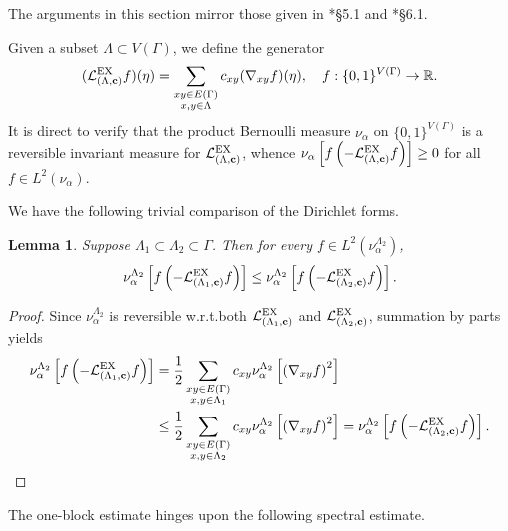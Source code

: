 \documentclass[11pt]{amsart}
\theoremstyle{plain}
\newtheorem{lemma}{Lemma}[section]
\theoremstyle{definition}
\theoremstyle{remark}
\begin{document}
The arguments in this section mirror those given in \cite{Jara}*{\S 5.1} and \cite{JLSLocal}*{\S 6.1}.

Given a subset $\Lambda \subset V(\Gamma)$, we define the generator
\begin{align}
(\mathcal{L}^{\rm EX}_{(\Lambda,{\bf c})} f)(\eta) = \sum_{\substack{xy\in E(\Gamma) \\ x,y \in \Lambda}} c_{xy} (\nabla_{xy} f)(\eta), \quad f: \{0,1\}^{V(\Gamma)} \to\mathbb{R}. 
\end{align}
It is direct to verify that the product Bernoulli measure $\nu_\alpha$ on $\{0,1\}^{V(\Gamma)}$ is a reversible invariant measure for $\mathcal{L}^{\rm EX}_{(\Lambda,{\bf c})}$, whence $\nu_\alpha\left[f \left( -\mathcal{L}^{\rm EX}_{(\Lambda,{\bf c})} f\right)\right] \geq 0$ for all $f\in L^2(\nu_\alpha)$. 

We have the following trivial comparison of the Dirichlet forms.
\begin{lemma}
\label{lem:DFEst1}
Suppose $\Lambda_1 \subset \Lambda_2 \subset \Gamma$. Then for every $f \in L^2(\nu_\alpha^{\Lambda_2})$, 
\begin{align}
\nu_\alpha^{\Lambda_2}\left[ f\left(-\mathcal{L}^{\rm EX}_{(\Lambda_1,{\bf c})}f\right)\right] \leq \nu_\alpha^{\Lambda_2} \left[ f \left( -\mathcal{L}^{\rm EX}_{(\Lambda_2,{\bf c})}f\right)\right].
 \end{align}
\end{lemma}
\begin{proof}
Since $\nu_\alpha^{\Lambda_2}$ is reversible w.r.t.\@ both $\mathcal{L}^{\rm EX}_{(\Lambda_1,{\bf c})}$ and $\mathcal{L}^{\rm EX}_{(\Lambda_2,{\bf c})}$, summation by parts yields
\begin{align*}
\nu_\alpha^{\Lambda_2}\left[ f\left(-\mathcal{L}^{\rm EX}_{(\Lambda_1,{\bf c})}f\right)\right] &= \frac{1}{2} \sum_{\substack{xy\in E(\Gamma)\\ x,y \in \Lambda_1}} c_{xy} \nu_\alpha^{\Lambda_2}\left[\left(\nabla_{xy} f\right)^2\right] \\ & \leq \frac{1}{2} \sum_{\substack{xy\in E(\Gamma)\\ x,y \in \Lambda_2}} c_{xy} \nu_\alpha^{\Lambda_2}\left[\left(\nabla_{xy} f\right)^2\right] 
=\nu_\alpha^{\Lambda_2} \left[ f \left( -\mathcal{L}^{\rm EX}_{(\Lambda_2,{\bf c})}f\right)\right].
\end{align*}
\end{proof} 

The one-block estimate hinges upon the following spectral estimate.
\end{document}
